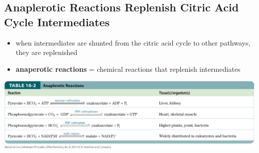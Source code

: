 \documentclass[10pt]{article}
\begin{document}
\subsection*{Anaplerotic Reactions Replenish Citric Acid Cycle Intermediates}
\begin{itemize}
	\item when intermediates are shunted from the citric acid cycle to other pathways, they are replenished
	\item \textbf{anaperotic reactions} = chemical reactions that replenish intermediates
\end{itemize}
\begin{center} 
    \includegraphics*[width=\textwidth]{L4_25.png} 
\end{center}
\end{document}
